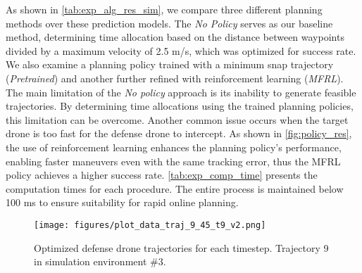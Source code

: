 As shown in \cref{tab:exp_alg_res_sim}, we compare three different planning methods over these prediction models.
The \textit{No Policy} serves as our baseline method, determining time allocation based on the distance between waypoints divided by a maximum velocity of 2.5 m/s, which was optimized for success rate.
We also examine a planning policy trained with a minimum snap trajectory (\textit{Pretrained}) and another further refined with reinforcement learning (\textit{MFRL}). 
The main limitation of the \textit{No policy} approach is its inability to generate feasible trajectories. 
By determining time allocations using the trained planning policies, this limitation can be overcome. 
Another common issue occurs when the target drone is too fast for the defense drone to intercept. 
As shown in \cref{fig:policy_res}, the use of reinforcement learning enhances the planning policy's performance, enabling faster maneuvers even with the same tracking error, thus the MFRL policy achieves a higher success rate.
\cref{tab:exp_comp_time} presents the computation times for each procedure. 
The entire process is maintained below 100 ms to ensure suitability for rapid online planning.


\begin{figure}[]
    \centering
    \texttt{[image: figures/plot\_data\_traj\_9\_45\_t9\_v2.png]}
    \caption{Optimized defense drone trajectories for each timestep. Trajectory 9 in simulation environment \#3.}
    \label{fig:exp_case_2}
\end{figure}

